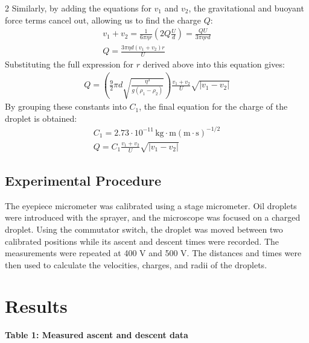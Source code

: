 \documentclass[a4paper,10pt]{report}
\begin{document}
\begin{multicols}{2}
Similarly, by adding the equations for $v_1$ and $v_2$, the gravitational and buoyant 
force terms cancel out, allowing us to find the charge $Q$:
\begin{gather*}
    v_1 + v_2 = \frac{1}{6\pi \eta r} \left( 2Q\frac{U}{d} \right) = \frac{QU}{3\pi \eta r d} \\
    Q = \frac{3\pi \eta d (v_1 + v_2) r}{U}
\end{gather*}
Substituting the full expression for $r$ derived above into this equation gives:
\begin{gather*}
    Q = \left( \frac{9}{2} \pi d \sqrt{\frac{\eta^3}{g(\rho_1 - \rho_2)}} \right) \frac{v_1 + v_2}{U} \sqrt{|v_1 - v_2|}
\end{gather*}
By grouping these constants into $C_1$, the final equation for the charge of the droplet 
is obtained:
\begin{gather}
    C_1 = 2.73 \cdot 10^{-11} \, \text{kg} \cdot \text{m} (\text{m} \cdot \text{s})^{-1/2} \\
    Q = C_1 \frac{v_1 + v_2}{U} \sqrt{|v_1 - v_2|}
\end{gather}


\subsection*{Experimental Procedure}
The eyepiece micrometer was calibrated using a stage micrometer. Oil droplets were
introduced with the sprayer, and the microscope was focused on a charged droplet. Using
the commutator switch, the droplet was moved between two calibrated positions while its
ascent and descent times were recorded. The measurements were repeated at 400 V and
500 V. The distances and times were then used to calculate the velocities, charges, and
radii of the droplets.

\section*{Results}
\begin{center}
\textbf{Table 1: Measured ascent and descent data} \\
\vspace{5pt}
\renewcommand{\arraystretch}{1.2}
\end{center}


\end{multicols}
\end{document}
